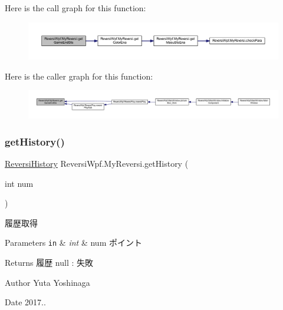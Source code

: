 Here is the call graph for this function\+:\nopagebreak
\begin{figure}[H]
\begin{center}
\leavevmode
\includegraphics[width=350pt]{class_reversi_wpf_1_1_my_reversi_a77a81c9c08a6dadcab0dd5741de1b88b_cgraph}
\end{center}
\end{figure}
Here is the caller graph for this function\+:\nopagebreak
\begin{figure}[H]
\begin{center}
\leavevmode
\includegraphics[width=350pt]{class_reversi_wpf_1_1_my_reversi_a77a81c9c08a6dadcab0dd5741de1b88b_icgraph}
\end{center}
\end{figure}
\mbox{\label{class_reversi_wpf_1_1_my_reversi_aa85fcb151ab7c188b0637b9eb9269baa}} 
\subsubsection{\texorpdfstring{get\+History()}{getHistory()}}
{\footnotesize\ttfamily \hyperlink{class_reversi_wpf_1_1_reversi_history}{Reversi\+History} Reversi\+Wpf.\+My\+Reversi.\+get\+History (\begin{DoxyParamCaption}\item[{int}]{num }\end{DoxyParamCaption})}



履歴取得 


\begin{DoxyParams}[1]{Parameters}
\mbox{\tt in}  & {\em int} & num ポイント \\
\hline
\end{DoxyParams}
\begin{DoxyReturn}{Returns}
履歴 null \+: 失敗 
\end{DoxyReturn}
\begin{DoxyAuthor}{Author}
Yuta Yoshinaga 
\end{DoxyAuthor}
\begin{DoxyDate}{Date}
2017.. 
\end{DoxyDate}


